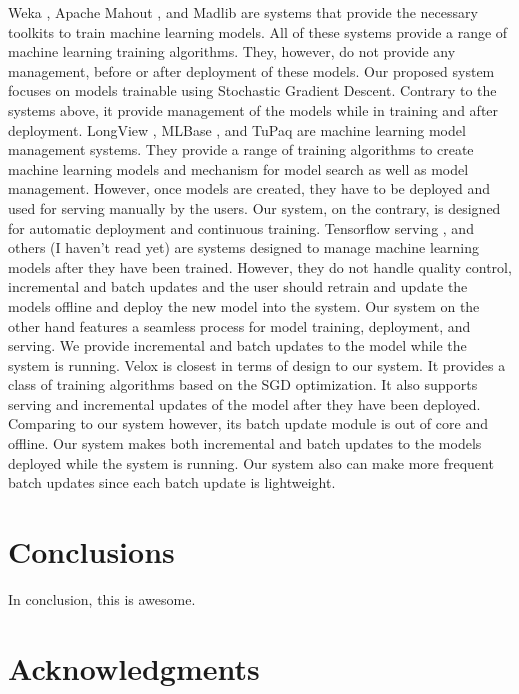 \documentclass{sig-alternate-05-2015}
\begin{document}
Weka \cite{hall2009weka}, Apache Mahout \cite{Owen:2011:MA:2132656}, and Madlib \cite{hellerstein2012madlib} are systems that provide the necessary toolkits to train machine learning models. All of these systems provide a range of machine learning training algorithms. 
They, however, do not provide any management, before or after deployment of these models. 
Our proposed system focuses on models trainable using Stochastic Gradient Descent. 
Contrary to the systems above, it provide management of the models while in training and after deployment.
LongView \cite{akdere2011case}, MLBase \cite{kraska2013mlbase}, and TuPaq \cite{sparks2015tupaq} are machine learning model management systems.
They provide a range of training algorithms to create machine learning models and mechanism for model search as well as model management.
However, once models are created, they have to be deployed and used for serving manually by the users.
Our system, on the contrary, is designed for automatic deployment and continuous training.
Tensorflow serving \cite{abadi2016tensorflow}, and others (I haven't read yet) are systems designed to manage machine learning models after they have been trained.
However, they do not handle quality control, incremental and batch updates and the user should retrain and update the models offline and deploy the new model into the system.
Our system on the other hand features a seamless process for model training, deployment, and serving. 
We provide incremental and batch updates to the model while the system is running.
Velox \cite{crankshaw2014missing} is closest in terms of design to our system.
It provides a class of training algorithms based on the SGD optimization.
It also supports serving and incremental updates of the model after they have been deployed.
Comparing to our system however, its batch update module is out of core and offline.
Our system makes both incremental and batch updates to the models deployed while the system is running.
Our system also can make more frequent batch updates since each batch update is lightweight.

\section{Conclusions} \label{conclusion}
In conclusion, this is awesome. 
\section{Acknowledgments}


\end{document}
